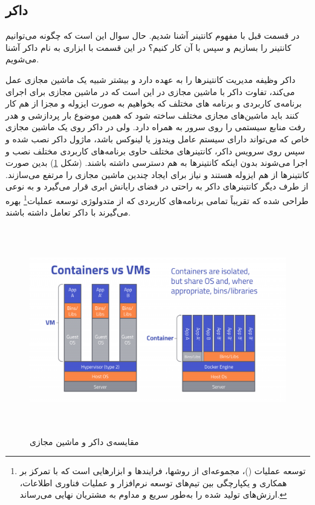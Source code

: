 \subsection{داکر}

در قسمت قبل با مفهوم کانتینر آشنا شدیم. حال سوال این است که چگونه می‌توانیم کانتینر را بسازیم و سپس با آن کار کنیم؟ در این قسمت با ابزاری به نام داکر آشنا می‌شویم.

داکر وظیفه مدیریت کانتینرها را به عهده دارد و بیشتر شبیه یک ماشین مجازی عمل می‌کند، تفاوت داکر با ماشین مجازی در این است که در ماشین مجازی برای اجرای برنامه‌ی کاربردی و برنامه های مختلف که بخواهیم به صورت ایزوله و مجزا از هم کار کنند باید ماشین‌های مجازی مختلف ساخته شود که همین موضوع بار پردازشی و هدر رفت منابع سیستمی را روی سرور به همراه دارد. ولی در داکر روی یک ماشین مجازی خاص که می‌تواند دارای سیستم عامل ویندوز یا لینوکس باشد، ماژول داکر نصب شده و سپس روی سرویس داکر، کانتینرهای مختلف حاوی برنامه‌های کاربردی مختلف نصب و اجرا می‌شوند بدون اینکه کانتینرها به هم دسترسی داشته باشند. (شکل \ref{dockerVsVm}) بدین صورت کانتینرها از هم ایزوله هستند و نیاز برای ایجاد چندین ماشین مجازی را مرتفع می‌سازند. از طرف دیگر کانتینرهای داکر به راحتی در فضای رایانش ابری قرار می‌گیرد و به نوعی طراحی شده که تقریباً تمامی برنامه‌های کاربردی که از متدولوژی توسعه عملیات\footnote{توسعه عملیات ()، مجموعه‌ای از روشها، فرایندها و ابزارهایی است که با تمرکز بر همکاری و یکپارچگی بین تیم‌های توسعه نرم‌افزار و عملیات فناوری اطلاعات، ارزش‌های تولید شده را به‌طور سریع و مداوم به مشتریان نهایی می‌رساند.} بهره می‌گیرند با داکر تعامل داشته باشند.

\begin{figure}[!h]
	\centering
	\includegraphics[height=9cm]{images/Docker-vs-VM}
	\caption{مقایسه‌ی داکر و ماشین مجازی}
	\label{dockerVsVm}
\end{figure}

